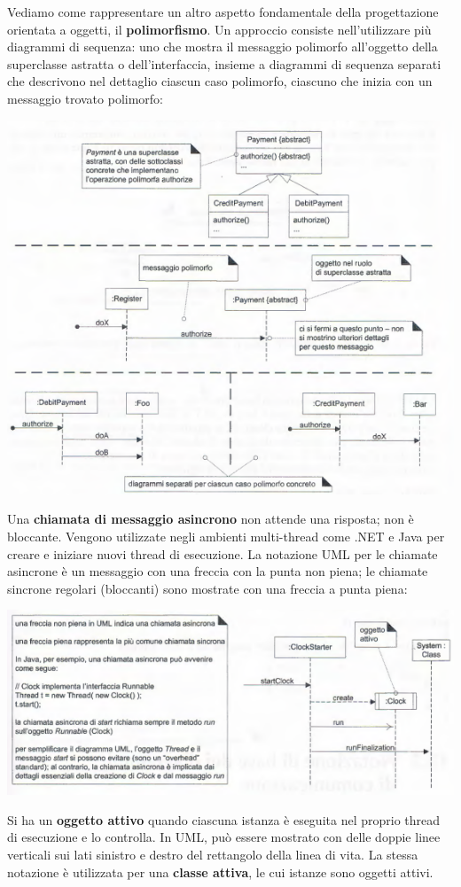 \documentclass[a4paper,12pt, oneside]{book}
\begin{document}
Vediamo come rappresentare un altro aspetto fondamentale della progettazione orientata a oggetti, il \textbf{polimorfismo}. Un approccio consiste nell'utilizzare più diagrammi di sequenza: uno che mostra il messaggio polimorfo all'oggetto della superclasse astratta o dell'interfaccia, insieme a diagrammi di sequenza separati che descrivono nel dettaglio ciascun caso polimorfo, ciascuno che inizia con un messaggio trovato polimorfo:
\begin{center}
	\includegraphics[scale=0.6]{img/polid.png}
\end{center}
Una \textbf{chiamata di messaggio asincrono} non attende una risposta; non è bloccante. Vengono utilizzate negli ambienti multi-thread come .NET e Java per creare e iniziare nuovi
thread di esecuzione. La notazione UML per le chiamate asincrone è un messaggio con una freccia con la
punta non piena; le chiamate sincrone regolari (bloccanti) sono mostrate con una freccia a punta piena:
\begin{center}
	\includegraphics[scale=0.6]{img/sincd.png}
\end{center}
Si ha un \textbf{oggetto attivo} quando ciascuna istanza
è eseguita nel proprio thread di esecuzione e lo controlla. In UML, può essere mostrato
con delle doppie linee verticali sui lati sinistro e destro del rettangolo della linea di vita.
La stessa notazione è utilizzata per una \textbf{classe attiva}, le cui istanze sono oggetti attivi.
\end{document}

